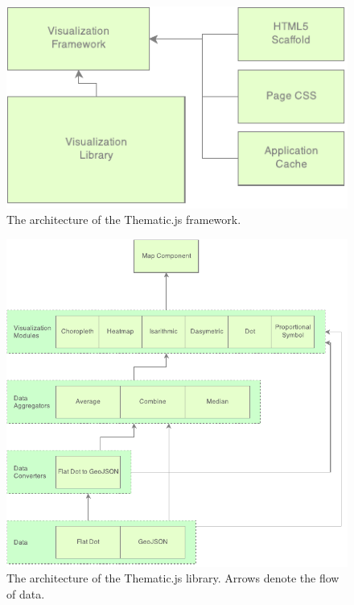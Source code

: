 \begin{figure}[htbp]
  \centering
  \includegraphics[width=\textwidth]{images/framework-architecture.pdf}
  \caption{The architecture of the Thematic.js framework.}
  \label{fig:framework_architecture}
\end{figure}

\begin{figure}[htbp]
  \centering
  \includegraphics[width=\textwidth]{images/library-architecture.pdf}
  \caption{The architecture of the Thematic.js library. Arrows denote the flow of data.}
  \label{fig:lib_architecture}
\end{figure}

